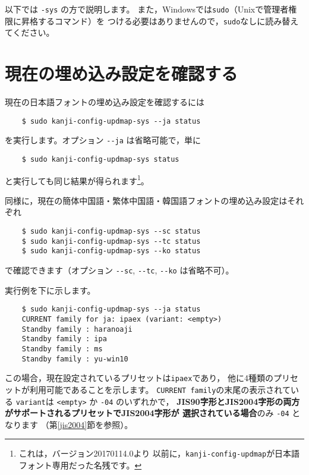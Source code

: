 \documentclass{jlreq}
\def\command#1{\texttt{#1}}
\def\option#1{\texttt{-{}-#1}}
\begin{document}
以下では \command{-sys} の方で説明します。
また，Windowsでは\command{sudo}（Unixで管理者権限に昇格するコマンド）を
つける必要はありませんので，\command{sudo}なしに読み替えてください。


\clearpage


\section{現在の埋め込み設定を確認する}

現在の日本語フォントの埋め込み設定を確認するには
\begin{verbatim}
    $ sudo kanji-config-updmap-sys --ja status
\end{verbatim}
を実行します。オプション \option{ja} は省略可能で，単に
\begin{verbatim}
    $ sudo kanji-config-updmap-sys status
\end{verbatim}
と実行しても同じ結果が得られます\footnote{これは，バージョン20170114.0より
以前に，\command{kanji-config-updmap}が日本語フォント専用だった名残です。}。

同様に，現在の簡体中国語・繁体中国語・韓国語フォントの埋め込み設定はそれぞれ
\begin{verbatim}
    $ sudo kanji-config-updmap-sys --sc status
    $ sudo kanji-config-updmap-sys --tc status
    $ sudo kanji-config-updmap-sys --ko status
\end{verbatim}
で確認できます（オプション \option{sc}, \option{tc}, \option{ko} は省略不可）。

実行例を下に示します。
\begin{verbatim}
    $ sudo kanji-config-updmap-sys --ja status
    CURRENT family for ja: ipaex (variant: <empty>)
    Standby family : haranoaji
    Standby family : ipa
    Standby family : ms
    Standby family : yu-win10
\end{verbatim}
この場合，現在設定されているプリセットは\command{ipaex}であり，
他に4種類のプリセットが利用可能であることを示します。
\command{CURRENT family}の末尾の表示されている
\command{variant}は \command{<empty>} か \command{-04} のいずれかで，
\textbf{JIS90字形とJIS2004字形の両方がサポートされるプリセットでJIS2004字形が
選択されている場合}のみ \command{-04} となります
（第\ref{jis2004}節を参照）。
\end{document}
